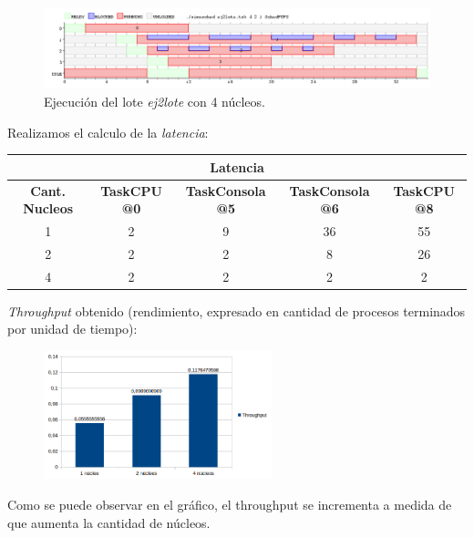 \begin{figure}[!h]
	\begin{center}
		\includegraphics[width=500px]{imagenes/ej2_4.png}
		\caption{Ejecución del lote \emph{ej2lote} con 4 núcleos.}
		\label{fig:grafico_ej2_4}
	\end{center}
\end{figure}

\newpage
Realizamos el calculo de la \textit{latencia}:

\begin{center}
	\begin{tabular}{|c|c|c|c|c|}
		\hline
		\multicolumn{5}{|c|}{\large{\textbf{Latencia}}} \\
		\hline
		\textbf{Cant. Nucleos} & \textbf{TaskCPU @0} & \textbf{TaskConsola @5} & \textbf{TaskConsola @6} & \textbf{TaskCPU @8} \\
		\hline
		1 & 2 & 9 & 36 & 55 \\
		2 & 2 & 2 & 8 & 26 \\
		4 & 2 & 2 & 2 & 2 \\
		\hline
	\end{tabular}
\end{center}

\textit{Throughput} obtenido (rendimiento, expresado en cantidad de procesos terminados por unidad de tiempo):
\begin{figure}[!h]
	\begin{center}
		\includegraphics[width=250px]{imagenes/ej2_throughput.png}

		\label{fig:grafico_ej2_throughput}
	\end{center}
\end{figure}

Como se puede observar en el gráfico, el throughput se incrementa a medida de que aumenta la cantidad de núcleos.

